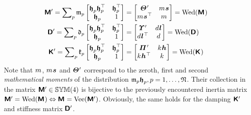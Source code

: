 \begin{subequations}
\begin{align}
 \bodyInertiaMatp{}{} = \sumParticles \particleMass{\PidxI} \begin{bmatrix} \particleBodyPos{\PidxI} \particleBodyPos{\PidxI}^\top & \particleBodyPos{\PidxI}^\top \\ \particleBodyPos{\PidxI} & 1 \end{bmatrix} 
 &= \begin{bmatrix} \bodyMOIp{}{}{} & \bodyMass{}{}\bodyCOM{}{}{} \\ \bodyMass{}{}\bodyCOM{}{}{}^\top & \bodyMass{}{} \end{bmatrix}
 = \wedMatOp(\bodyInertiaMat{}{})
\\
 \bodyDissMatp{}{} = \sumParticles \particleDamping{\PidxI} \begin{bmatrix} \particleBodyPos{\PidxI} \particleBodyPos{\PidxI}^\top & \particleBodyPos{\PidxI}^\top \\ \particleBodyPos{\PidxI} & 1 \end{bmatrix} 
 &= \begin{bmatrix} \bodyMODp{}{}{} & \bodyDamping{}{}\bodyCOD{}{}{} \\ \bodyDamping{}{}\bodyCOD{}{}{}^\top & \bodyDamping{}{} \end{bmatrix}
 = \wedMatOp(\bodyDissMat{}{})
\\
 \bodyStiffMatp{}{} = \sumParticles \particleStiffness{\PidxI} \begin{bmatrix} \particleBodyPos{\PidxI} \particleBodyPos{\PidxI}^\top & \particleBodyPos{\PidxI}^\top \\ \particleBodyPos{\PidxI} & 1 \end{bmatrix} 
 &= \begin{bmatrix} \bodyMOSp{}{}{} & \bodyStiffness{}{}\bodyCOS{}{}{} \\ \bodyStiffness{}{}\bodyCOS{}{}{}^\top & \bodyStiffness{}{} \end{bmatrix}
 = \wedMatOp(\bodyStiffMat{}{})
\end{align}
\end{subequations}
Note that $\bodyMass{}{}$, $\bodyMass{}{}\bodyCOM{}{}{}$ and $\bodyMOIp{}{}{}$ correspond to the zeroth, first and second \textit{mathematical moments} of the distribution $\mathfrak{m}_{p} \boldsymbol{\mathfrak{h}}_{p}, p=1,\ldots,\mathfrak{N}$.
Their collection in the matrix $\bodyInertiaMatp{}{} \in \SymMat(4)$ is bijective to the previously encountered inertia matrix $\bodyInertiaMatp{}{} = \wedMatOp(\bodyInertiaMat{}{}) \Leftrightarrow \bodyInertiaMat{}{} = \veeMatOp(\bodyInertiaMatp{}{})$.
Obviously, the same holds for the damping $\bodyStiffMatp{}{}$ and stiffness matrix $\bodyDissMatp{}{}$.

